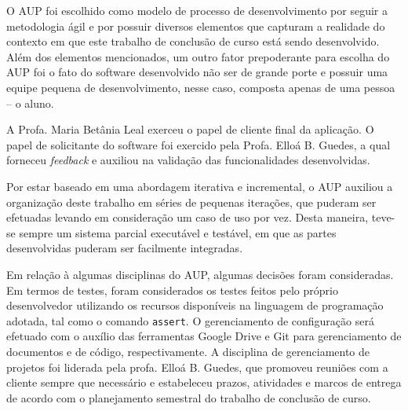 O AUP foi escolhido como modelo de processo de desenvolvimento por seguir a metodologia ágil e por possuir diversos elementos que capturam a realidade do contexto em que este trabalho de conclusão de curso está sendo desenvolvido. Além dos elementos mencionados, um outro fator prepoderante para escolha do AUP foi o fato do software  desenvolvido não ser de grande porte e possuir uma equipe pequena de desenvolvimento, nesse caso, composta apenas de uma pessoa -- o aluno.

A Profa. Maria Betânia Leal exerceu o papel de cliente final da aplicação. O papel de solicitante do software foi exercido pela Profa. Elloá B. Guedes, a qual forneceu \emph{feedback} e auxiliou na validação das funcionalidades desenvolvidas.

Por estar baseado em uma abordagem iterativa e incremental, o AUP auxiliou a organização deste trabalho em séries de pequenas iterações, que puderam ser efetuadas levando em consideração um caso de uso por vez. Desta maneira, teve-se sempre um sistema parcial executável e testável, em que as partes desenvolvidas puderam ser facilmente integradas.

Em relação à algumas disciplinas do AUP, algumas decisões foram consideradas. Em termos de testes, foram considerados os testes feitos pelo próprio desenvolvedor utilizando os recursos disponíveis na linguagem de programação adotada, tal como o comando \texttt{assert}. O gerenciamento de configuração será efetuado com o auxílio das ferramentas Google Drive e Git para gerenciamento de documentos e de código, respectivamente. A disciplina de gerenciamento de projetos foi liderada pela profa. Elloá B. Guedes, que promoveu reuniões com a cliente sempre que necessário e estabeleceu prazos, atividades e marcos de entrega de acordo com o planejamento semestral do trabalho de conclusão de curso.
